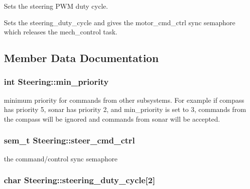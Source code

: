 Sets the steering P\-W\-M duty cycle. 

Sets the steering\-\_\-duty\-\_\-cycle and gives the motor\-\_\-cmd\-\_\-ctrl sync semaphore which releases the mech\-\_\-control task. 

\subsection{Member Data Documentation}
\hypertarget{classSteering_ab31761e4665bf81e580f1bc32c9fff79}{
\subsubsection[{min\-\_\-priority}]{\setlength{\rightskip}{0pt plus 5cm}int Steering\-::min\-\_\-priority\hspace{0.3cm}{\ttfamily [protected]}}}\label{classSteering_ab31761e4665bf81e580f1bc32c9fff79}
minimum priority for commands from other subsystems. For example if compass has priority 5, sonar has priority 2, and min\-\_\-priority is set to 3, commands from the compass will be ignored and commands from sonar will be accepted. \hypertarget{classSteering_af9a4f30e9dc0dc37b31a421cb88ca8ba}{
\subsubsection[{steer\-\_\-cmd\-\_\-ctrl}]{\setlength{\rightskip}{0pt plus 5cm}sem\-\_\-t Steering\-::steer\-\_\-cmd\-\_\-ctrl\hspace{0.3cm}{\ttfamily [protected]}}}\label{classSteering_af9a4f30e9dc0dc37b31a421cb88ca8ba}
the command/control sync semaphore \hypertarget{classSteering_a3eb0bda8706c97d35c0ae31daeefa5a1}{
\subsubsection[{steering\-\_\-duty\-\_\-cycle}]{\setlength{\rightskip}{0pt plus 5cm}char Steering\-::steering\-\_\-duty\-\_\-cycle\mbox{[}2\mbox{]}\hspace{0.3cm}{\ttfamily [protected]}}}\label{classSteering_a3eb0bda8706c97d35c0ae31daeefa5a1}
